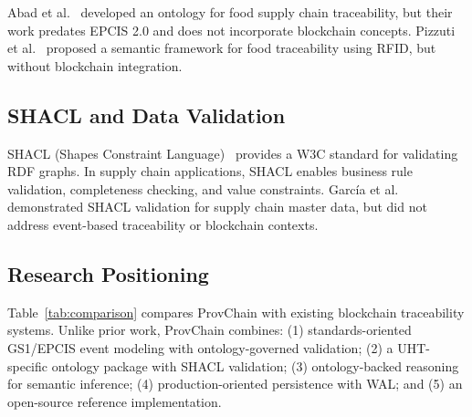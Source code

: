 \documentclass[preprint,review,12pt,authoryear]{elsarticle}
\begin{document}
Abad et al.~\cite{abad2020ontology} developed an ontology for food supply chain traceability, but their work predates EPCIS 2.0 and does not incorporate blockchain concepts. Pizzuti et al.~\cite{pizzuti2015food} proposed a semantic framework for food traceability using RFID, but without blockchain integration.

\subsection{SHACL and Data Validation}

SHACL (Shapes Constraint Language)~\cite{knublauch2017shapes} provides a W3C standard for validating RDF graphs. In supply chain applications, SHACL enables business rule validation, completeness checking, and value constraints. Garc\'{i}a et al.~\cite{garcia2022shacl} demonstrated SHACL validation for supply chain master data, but did not address event-based traceability or blockchain contexts.

\subsection{Research Positioning}

Table~\ref{tab:comparison} compares ProvChain with existing blockchain traceability systems. Unlike prior work, ProvChain combines: (1) standards-oriented GS1/EPCIS event modeling with ontology-governed validation; (2) a UHT-specific ontology package with SHACL validation; (3) ontology-backed reasoning for semantic inference; (4) production-oriented persistence with WAL; and (5) an open-source reference implementation.
\end{document}
